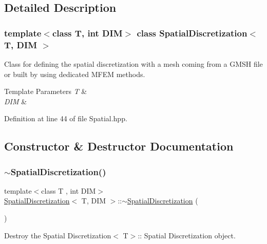 \subsection{Detailed Description}
\subsubsection*{template$<$class T, int D\+IM$>$\newline
class Spatial\+Discretization$<$ T, D\+I\+M $>$}

Class for defining the spatial discretization with a mesh coming from a G\+M\+SH file or built by using dedicated M\+F\+EM methods. 


\begin{DoxyTemplParams}{Template Parameters}
{\em T} & \\
\hline
{\em D\+IM} & \\
\hline
\end{DoxyTemplParams}


Definition at line 44 of file Spatial.\+hpp.



\subsection{Constructor \& Destructor Documentation}
\mbox{\label{classSpatialDiscretization_a67d6d572cea0c15e063386b7bf0e8149}} 
\subsubsection{\texorpdfstring{$\sim$\+Spatial\+Discretization()}{~SpatialDiscretization()}}
{\footnotesize\ttfamily template$<$class T , int D\+IM$>$ \\
\hyperlink{classSpatialDiscretization}{Spatial\+Discretization}$<$ T, D\+IM $>$\+::$\sim$\hyperlink{classSpatialDiscretization}{Spatial\+Discretization} (\begin{DoxyParamCaption}{ }\end{DoxyParamCaption})}



Destroy the Spatial Discretization$<$ T$>$\+:\+: Spatial Discretization object. 


